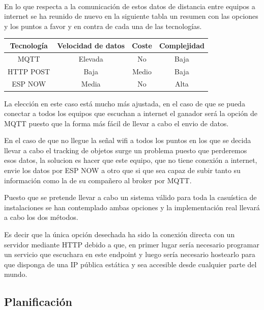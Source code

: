 \documentclass[paper=a4, fontsize=11pt,twoside]{scrartcl}	%
\begin{document}
        \paragraph{}
        En lo que respecta a la comunicación de estos datos de distancia entre equipos a internet se ha reunido de nuevo en la 
        siguiente tabla un resumen con las opciones y los puntos a favor y en contra de cada una de las tecnologías.
        \begin{center}
            \begin{tabular}{||c | c| c| c||} 
            \hline
            Tecnología  & Velocidad de datos & Coste & Complejidad \\ [0.5ex] 
            \hline
            MQTT& Elevada  & No & Baja\\
            HTTP POST& Baja & Medio & Baja\\ 
            ESP NOW& Media & No & Alta\\ 
            \hline
            \end{tabular}
        \end{center}   
        La elección en este caso está mucho más ajustada, en el caso de que se pueda conectar a todos los equipos que 
        escuchan a internet el ganador será la opción de MQTT puesto que la forma más fácil de llevar a cabo el envio de datos.

        En el caso de que no llegue la señal wifi a todos los puntos en los que se decida llevar a cabo el tracking de objetos 
        surge un problema puesto que perderemos esos datos, la solucion es hacer que este equipo, que no tiene conexión a internet,
        envie los datos por ESP NOW a otro que si que sea capaz de subir tanto su información como la de su compañero al broker por MQTT.

        Puesto que se pretende llevar a cabo un sistema válido para toda la casuística de instalaciones se han contemplado ambas opciones
        y la implementación real llevará a cabo los dos métodos.
        
        Es decir que la única opción desechada ha sido la conexión directa con un servidor mediante HTTP debido a que, en primer
        lugar sería necesario programar un servicio que escuchara en este endpoint y luego sería necesario hostearlo 
        para que disponga de una IP pública estática y sea accesible desde cualquier parte del mundo.
    \subsection{Planificación}
\end{document}
